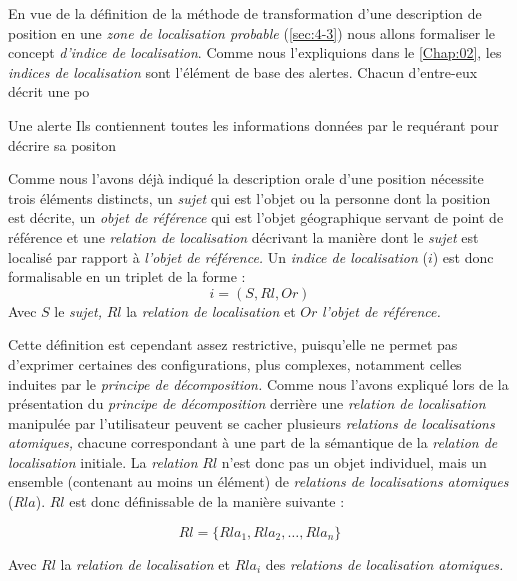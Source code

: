 En vue de la définition de la méthode de transformation d'une
description de position en une \emph{zone de localisation probable}
(\autoref{sec:4-3}) nous allons formaliser le concept \emph{d'indice
  de localisation}. Comme nous l'expliquions dans le
\autoref{Chap:02}, les \emph{indices de localisation} sont l'élément
de base des alertes. Chacun d'entre-eux décrit une po


Une alerte 
Ils contiennent toutes les informations données par le requérant pour
décrire sa positon

Comme nous l'avons déjà indiqué la description orale d'une position
nécessite trois éléments distincts, un \emph{sujet} qui est l'objet ou
la personne dont la position est décrite, un \emph{objet de référence}
qui est l'objet géographique servant de point de référence et une
\emph{relation de localisation} décrivant la manière dont le
\emph{sujet} est localisé par rapport à \emph{l'objet de référence.}
Un \emph{indice de localisation} (\(i\)) est donc formalisable en un
triplet de la forme :
%
\begin{equation}
  i = (S, Rl, Or)
\end{equation}
%
Avec \(S\) le \emph{sujet,} \(Rl\) la \emph{relation de localisation}
et \(Or\) \emph{l'objet de référence.}

Cette définition est cependant assez restrictive, puisqu'elle ne
permet pas d'exprimer certaines des configurations, plus complexes,
notamment celles induites par le \emph{principe de décomposition.}
Comme nous l'avons expliqué lors de la présentation du \emph{principe
  de décomposition} derrière une \emph{relation de localisation}
manipulée par l'utilisateur peuvent se cacher plusieurs
\emph{relations de localisations atomiques,} chacune correspondant à
une part de la sémantique de la \emph{relation de localisation}
initiale. La \emph{relation} \(Rl\) n'est donc pas un objet
individuel, mais un ensemble (contenant au moins un élément) de
\emph{relations de localisations atomiques} (\(Rla\)). \(Rl\) est donc
définissable de la manière suivante :

\begin{equation}
  Rl = \{Rla_1, Rla_2, \ldots, Rla_n\}
\end{equation}

Avec \(Rl\) la \emph{relation de localisation} et \(Rla_i\) des
\emph{relations de localisation atomiques.}

